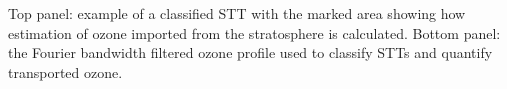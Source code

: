 \label{fig:sttquant}
Top panel: example of a classified STT with the marked area showing how estimation of ozone imported from the stratosphere is calculated.
Bottom panel: the Fourier bandwidth filtered ozone profile used to classify STTs and quantify transported ozone.